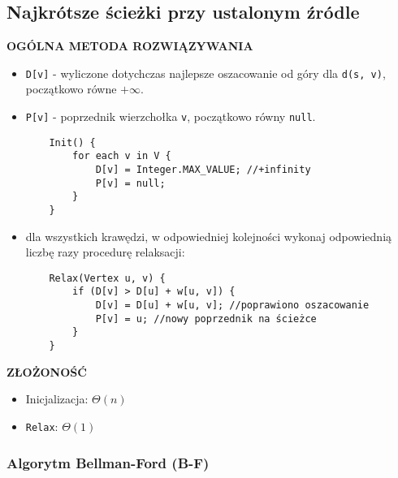 \documentclass[algorytmy.tex]{subfiles}
\begin{document}
\subsection{Najkrótsze ścieżki przy ustalonym źródle}
    \textbf{OGÓLNA METODA ROZWIĄZYWANIA}
    \begin{itemize}
        \item \texttt{D[v]} - wyliczone dotychczas najlepsze oszacowanie od góry
            dla \texttt{d(s, v)}, początkowo równe $+\infty$.
        \item \texttt{P[v]} - poprzednik wierzchołka \texttt{v}, początkowo
            równy \texttt{null}.

        \begin{verbatim}
    Init() {
        for each v in V {
            D[v] = Integer.MAX_VALUE; //+infinity
            P[v] = null;
        }
    }
        \end{verbatim}

    \item dla wszystkich krawędzi, w odpowiedniej kolejności wykonaj odpowiednią
        liczbę razy procedurę relaksacji:

        \begin{verbatim}
    Relax(Vertex u, v) {
        if (D[v] > D[u] + w[u, v]) {
            D[v] = D[u] + w[u, v]; //poprawiono oszacowanie
            P[v] = u; //nowy poprzednik na ścieżce
        }
    }
    \end{verbatim}
    \end{itemize}

    \textbf{ZŁOŻONOŚĆ}
    \begin{itemize}
        \item Inicjalizacja: $\Theta(n)$
        \item \texttt{Relax}: $\Theta(1)$
    \end{itemize}

    \pagebreak

    \subsubsection{Algorytm Bellman-Ford (B-F)}
\end{document}
